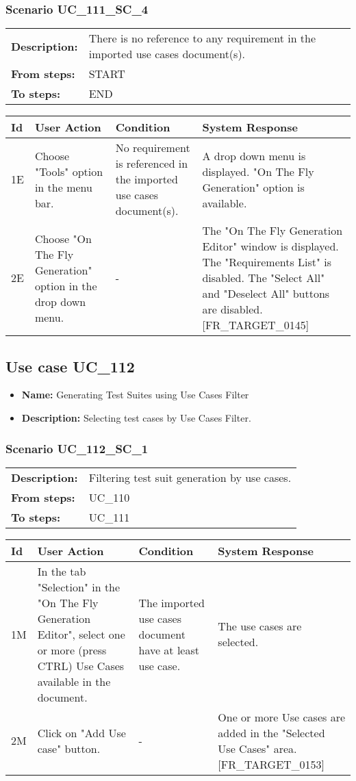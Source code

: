 \documentclass[a4paper,11pt]{article}
\newcommand{\bl}{\\ \hline}
\begin{document}
\subsubsection*{Scenario UC_111_SC_4}
\begin{tabular}{p{1in}p{4in}}
{\bf Description:} & There is no reference to any requirement in the imported use cases document(s). \\
{\bf From steps:} & START \\
{\bf To steps:} & END \\
\end{tabular}
 
\begin{tabular}{|p{0.8in}|p{1.6in}|p{1.6in}|p{1.6in}|}
\hline
Id & User Action & Condition & System Response  \bl 
1E & Choose "Tools" option in the menu bar. & No requirement is referenced in the imported use cases document(s). & A drop down menu is displayed. "On The Fly Generation" option is available. \bl 
2E & Choose "On The Fly Generation" option in the drop down menu. & - & The "On The Fly Generation Editor" window is displayed. The "Requirements List" is disabled. The "Select All" and "Deselect All" buttons are disabled. [FR_TARGET_0145] \bl 
\end{tabular}
\subsection*{Use case UC_112}
\begin{itemize}
\item {\bf Name: }Generating Test Suites using Use Cases Filter
\item {\bf Description: }Selecting test cases by Use Cases Filter.
\end{itemize}
\subsubsection*{Scenario UC_112_SC_1}
\begin{tabular}{p{1in}p{4in}}
{\bf Description:} & Filtering test suit generation by use cases. \\
{\bf From steps:} & UC_110#2M \\
{\bf To steps:} & UC_111#2M \\
\end{tabular}
 
\begin{tabular}{|p{0.8in}|p{1.6in}|p{1.6in}|p{1.6in}|}
\hline
Id & User Action & Condition & System Response  \bl 
1M & In the tab "Selection" in the "On The Fly Generation Editor", select one or more (press CTRL) Use Cases available in the document. & The imported use cases document have at least use case. & The use cases are selected. \bl 
2M & Click on "Add Use case" button. & - & One or more Use cases are added in the "Selected Use Cases" area. [FR_TARGET_0153] \bl 
\end{tabular}
\end{document}
